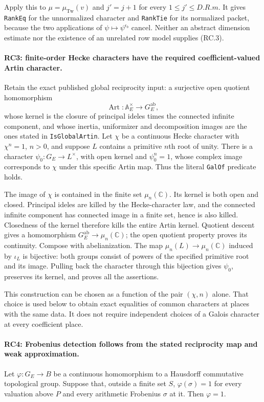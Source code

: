 Apply this to $\mu=\mu_{\mathrm{Tw}}(v)$ and $j'=j+1$ for every
$1\le j'\le D.R.m$. It gives \texttt{RankEq} for the unnormalized
character and \texttt{RankTie} for its normalized packet, because the
two applications of $\psi\mapsto\psi^{\epsilon_b}$ cancel.
Neither an abstract dimension estimate nor the existence of an unrelated
row model supplies (RC.3).

\paragraph{RC3: finite-order Hecke characters have the required coefficient-valued Artin character.}
Retain the exact published global reciprocity input: a surjective open
quotient homomorphism
\[
 \operatorname{Art}:\mathbb A_E^\times\longrightarrow G_E^{\mathrm{ab}},
\]
whose kernel is the closure of principal ideles times the connected
infinite component, and whose inertia, uniformizer and decomposition
images are the ones stated in \texttt{IsGlobalArtin}.
Let $\chi$ be a continuous Hecke character with $\chi^n=1$, $n>0$,
and suppose $L$ contains a primitive $n$th root of unity.
There is a character $\psi_0:G_E\to L^\times$, with open kernel and
$\psi_0^n=1$, whose complex image corresponds to $\chi$ under this
specific Artin map. Thus the literal \texttt{GalOf} predicate holds.

The image of $\chi$ is contained in the finite set $\mu_n(\mathbb C)$.
Its kernel is both open and closed. Principal ideles are killed by the
Hecke-character law, and the connected infinite component has connected
image in a finite set, hence is also killed. Closedness of the kernel
therefore kills the entire Artin kernel. Quotient descent gives a
homomorphism $G_E^{\mathrm{ab}}\to\mu_n(\mathbb C)$; the open quotient
property proves its continuity. Compose with abelianization.
The map $\mu_n(L)\to\mu_n(\mathbb C)$ induced by $\iota_L$ is bijective:
both groups consist of powers of the specified primitive root and its
image. Pulling back the character through this bijection gives $\psi_0$,
preserves its kernel, and proves all the assertions.

This construction can be chosen as a function of the pair $(\chi,n)$
alone. That choice is used below to obtain exact equalities of common
characters at places with the same data. It does not require independent
choices of a Galois character at every coefficient place.

\paragraph{RC4: Frobenius detection follows from the stated reciprocity map and weak approximation.}
Let $\varphi:G_E\to B$ be a continuous homomorphism to a Hausdorff
commutative topological group. Suppose that, outside a finite set $S$,
$\varphi(\sigma)=1$ for every valuation above $P$ and every arithmetic
Frobenius $\sigma$ at it. Then $\varphi=1$.

